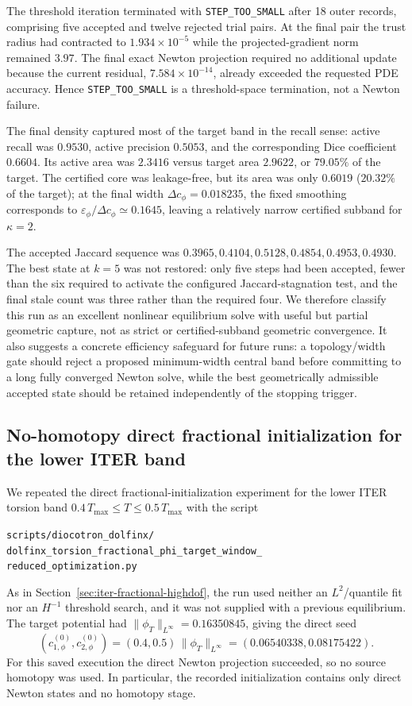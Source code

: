 The threshold iteration terminated with \texttt{STEP\_TOO\_SMALL} after 18
outer records, comprising five accepted and twelve rejected trial pairs. At
the final pair the trust radius had contracted to
$1.934\times10^{-5}$ while the projected-gradient norm remained $3.97$.
The final exact Newton projection required no additional update because the
current residual, $7.584\times10^{-14}$, already exceeded the requested PDE
accuracy. Hence \texttt{STEP\_TOO\_SMALL} is a threshold-space termination,
not a Newton failure.

The final density captured most of the target band in the recall sense:
active recall was $0.9530$, active precision $0.5053$, and the corresponding
Dice coefficient $0.6604$. Its active area was $2.3416$ versus target area
$2.9622$, or $79.05\%$ of the target. The certified core was leakage-free,
but its area was only $0.6019$ ($20.32\%$ of the target); at the final width
$\Delta c_\phi=0.018235$, the fixed smoothing corresponds to
$\varepsilon_\phi/\Delta c_\phi\simeq0.1645$, leaving a relatively narrow
certified subband for $\kappa=2$.

The accepted Jaccard sequence was
$0.3965,0.4104,0.5128,0.4854,0.4953,0.4930$. The best state at $k=5$ was not
restored: only five steps had been accepted, fewer than the six required to
activate the configured Jaccard-stagnation test, and the final stale count was
three rather than the required four. We therefore classify this run as an
excellent nonlinear equilibrium solve with useful but partial geometric
capture, not as strict or certified-subband geometric convergence. It also
suggests a concrete efficiency safeguard for future runs: a topology/width
gate should reject a proposed minimum-width central band before committing to
a long fully converged Newton solve, while the best geometrically admissible
accepted state should be retained independently of the stopping trigger.

\clearpage
\subsection{No-homotopy direct fractional initialization for the lower ITER band}
\label{sec:iter-fractional-0p4-0p5}
We repeated the direct fractional-initialization experiment for the lower
ITER torsion band
$0.4\,T_{\max}\leq T\leq0.5\,T_{\max}$ with the script
\begin{center}
  \small
  \texttt{scripts/diocotron\_dolfinx/}\\[-0.2ex]
  \texttt{dolfinx\_torsion\_fractional\_phi\_target\_window\_}\\[-0.2ex]
  \texttt{reduced\_optimization.py}
\end{center}
As in Section~\ref{sec:iter-fractional-highdof}, the run used neither an
$L^2$/quantile fit nor an $H^{-1}$ threshold search, and it was not supplied
with a previous equilibrium. The target potential had
$\|\phi_T\|_{L^\infty}=0.16350845$, giving the direct seed
\[
  (c_{1,\phi}^{(0)},c_{2,\phi}^{(0)})
  =(0.4,0.5)\,\|\phi_T\|_{L^\infty}
  =(0.06540338,0.08175422).
\]
For this saved execution the direct Newton projection succeeded, so no source
homotopy was used. In particular, the recorded initialization contains only
direct Newton states and no homotopy stage.

